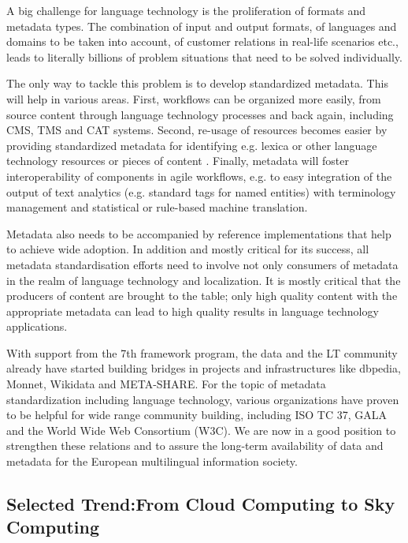 \documentclass[10pt, plain]{../../metanetpaper}
\begin{document}
\begin{multicols}{2}
A big challenge for language technology is the proliferation of formats and metadata types. The combination of input and output formats, of languages and domains to be taken into account, of customer relations in real-life scenarios etc., leads to literally billions of problem situations that need to be solved individually.

The only way to tackle this problem is to develop standardized metadata. This will help in various areas. First, workflows can be organized more easily, from source content through language technology processes and back again, including CMS, TMS  and CAT systems. Second, re-usage of resources becomes easier by providing standardized metadata for identifying e.g. lexica or other language technology resources or pieces of content . Finally, metadata will foster interoperability of components in agile workflows, e.g. to easy integration of the output of text analytics (e.g. standard tags for named entities) with terminology management and statistical or rule-based machine translation.

Metadata also needs to be accompanied by reference implementations that help to achieve wide adoption. In addition and mostly critical for its success, all metadata standardisation efforts need to involve not only consumers of metadata in the realm of language technology and localization. It is mostly critical that the producers of content are brought to the table; only high quality content with the appropriate metadata can lead to high quality results in language technology applications.

With support from the 7th framework program, the data and the LT community already have started building bridges in projects and infrastructures like dbpedia, Monnet, Wikidata and META-SHARE. For the topic of metadata standardization including language technology, various organizations have proven to be helpful for wide range community building, including ISO TC 37, GALA and the World Wide Web Consortium (W3C). We are now in a good position to strengthen these relations and to assure the long-term availability of data and metadata for the European multilingual information society.

\subsection[Selected Trend: From Cloud Computing to Sky Computing]{Selected Trend:\newline From Cloud Computing to Sky Computing}
\label{sec:cloud-sky-computing}


\end{multicols}
\end{document}
